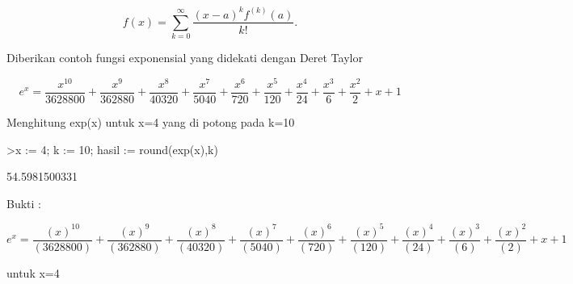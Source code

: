 \documentclass[a4paper,10pt]{article}
\begin{document}
\begin{eulernotebook}
\begin{eulercomment}
\begin{eulercomment}
\begin{eulercomment}
\begin{eulercomment}
\begin{eulercomment}
\end{eulercomment}
\begin{eulerformula}
\[
f(x) = \sum_{k=0}^\infty \frac{(x-a)^k f^{(k)}(a)}{k!}.
\]
\end{eulerformula}
\begin{eulercomment}
Diberikan contoh fungsi exponensial yang didekati dengan Deret Taylor
\end{eulercomment}
\begin{eulerformula}
\[
e^{x}=\frac{x^{10}}{3628800}+\frac{x^9}{362880}+\frac{x^8}{40320}+  \frac{x^7}{5040}+\frac{x^6}{720}+\frac{x^5}{120}+\frac{x^4}{24}+  \frac{x^3}{6}+\frac{x^2}{2}+x+1
\]
\end{eulerformula}
\begin{eulercomment}
Menghitung exp(x) untuk x=4 yang di potong pada k=10
\end{eulercomment}
\begin{eulerprompt}
>x := 4; k := 10; hasil := round(exp(x),k)
\end{eulerprompt}
\begin{euleroutput}
  54.5981500331
\end{euleroutput}
\begin{eulercomment}
Bukti :

\end{eulercomment}
\begin{eulerformula}
\[
e^x = \frac{(x)^{10}}{(3628800)} + \frac{(x)^{9}}{(362880)} + \frac{(x)^{8}}{(40320)} + \frac{(x)^{7}}{(5040)} + \frac{(x)^{6}}{(720)} + \frac{(x)^{5}}{(120)} + \frac{(x)^{4}}{(24)} + \frac{(x)^{3}}{(6)} + \frac{(x)^{2}}{(2)} + x + 1
\]
\end{eulerformula}
\begin{eulercomment}
untuk x=4


\end{eulercomment}
\end{eulercomment}
\end{eulercomment}
\end{eulercomment}
\end{eulercomment}
\end{eulernotebook}
\end{document}
